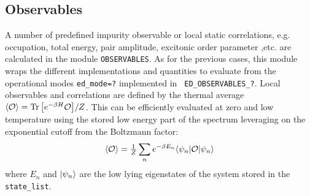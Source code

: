 \documentclass[edipack2.tex]{subfiles}
\begin{document}
\subsection{Observables}\label{sSecObc}
A number of predefined impurity observable or local static
correlations, e.g. occupation, total energy, pair amplitude, excitonic
order parameter ,etc.   are calculated in the module
\texttt{OBSERVABLES}. As for the previous cases, this module wraps the
different implementations and quantities to evaluate from the
operational modes {\tt ed\_mode=?} implemented in {\tt
  ED\_OBSERVABLES\_?}. 
Local observables and correlations are defined by the thermal average  $\langle {\cal O}\rangle =
{\rm Tr}\,{\left[e^{-\beta H}{\cal O}\right]}/Z$. This can be efficiently evaluated at zero and
low temperature using the stored low energy part of the spectrum
leveraging on the exponential cutoff from the Boltzmann factor:
$$
\langle {\cal O}\rangle  = \tfrac{1}{Z}\sum_n e^{-\beta
  E_n}\langle \psi_n|{\cal O}|\psi_n\rangle
$$
where $E_n$ and $|\psi_n\rangle$ are the low lying eigenstates of the
system stored in the {\tt state\_list}. 
\end{document}
